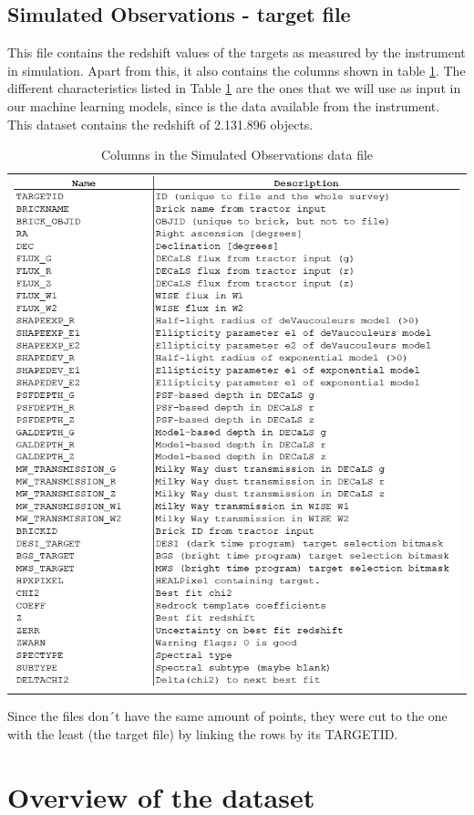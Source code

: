 \subsection{Simulated Observations - target file}
This file contains the redshift values of the targets as measured by the instrument in simulation. Apart from this, it also contains the columns shown in table \ref{tab:tar_car}. The different characteristics listed in Table \ref{tab:tar_car} are the ones that we will use as input in our machine learning models, since is the data available from the instrument. This dataset contains the redshift of 2.131.896 objects. 
\begin{table}[!htbp]
	\centering
	\begin{tabular}{c}
	    \includegraphics[width=0.9\linewidth]{TeX_files/Imagenes/Imagen1}	
	\end{tabular} 
	\caption{Columns in the Simulated Observations data file }
	\label{tab:tar_car}
\end{table}
Since the files don´t have the same amount of points, they were cut to the one with the least (the target file) by linking the rows by its TARGETID. 
\section{Overview of the dataset}
